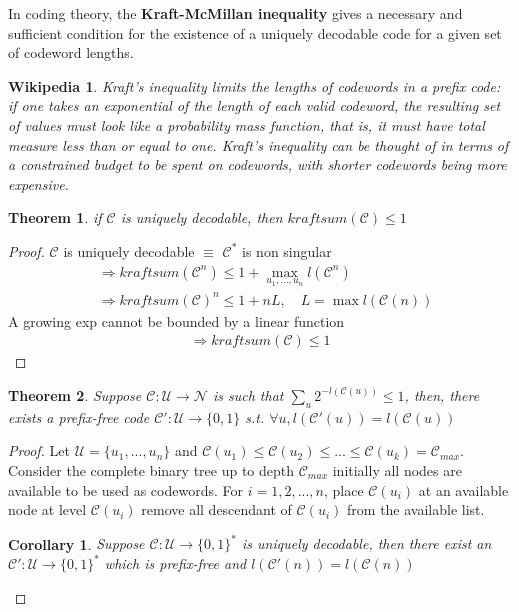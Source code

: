 \documentclass[twoside]{article}
\newtheorem{theorem}{Theorem}[section]
\newtheorem{corollary}{Corollary}[theorem]
\newtheorem*{wikipedia}{Wikipedia}
\theoremstyle{definition} %
\def\U{\mathcal{U}}
\def\N{\mathcal{N}}
\def\C{\mathcal{C}}
\begin{document}
In coding theory, the \textbf{Kraft-McMillan inequality} gives a necessary and sufficient condition for the existence of a uniquely decodable code for a given set of codeword lengths.

\begin{wikipedia}
  Kraft's inequality limits the lengths of codewords in a prefix code: if one takes an exponential of the length of each valid codeword, the resulting set of values must look like a probability mass function, that is, it must have total measure less than or equal to one. Kraft's inequality can be thought of in terms of a constrained budget to be spent on codewords, with shorter codewords being more expensive.
\end{wikipedia}

\begin{theorem}
  if $\C$ is uniquely decodable, then $kraftsum(\C) \leq 1$
\end{theorem}

\begin{proof}
  $\C$ is uniquely decodable $\equiv$ $\C^*$ is non singular
  \begin{align*}
    &\Rightarrow kraftsum(\C^n) \leq 1 + \max _{u_1, ..., u_n} l(\C^n) \\
    &\Rightarrow kraftsum(\C)^n \leq 1 + n L, \quad L = \max l(\C(n))
  \end{align*}
  A growing exp cannot be bounded by a linear function
  \begin{align*}
    \Rightarrow kraftsum(\C) \leq 1
  \end{align*}
\end{proof}

\begin{theorem}
  Suppose $\C : \U \rightarrow \N$ is such that $\sum_u 2^{-l(\C(u))} \leq 1$, then, there exists a prefix-free code $\C': \U \rightarrow \{0, 1\}$ s.t. $\forall u, l(\C'(u)) = l(\C(u))$
\end{theorem}

\begin{proof}
  Let $\U = \{u_1, ..., u_n\}$ and $\C(u_1) \leq \C(u_2) \leq ... \leq \C(u_k) = \C_{max}$.
  Consider the complete binary tree up to depth $\C_{max}$ initially all nodes are available to be used as codewords.
  For $i = 1, 2, ..., n$, place $\C(u_i)$ at an available node at level $\C(u_i)$ remove all descendant of $\C(u_i)$ from the available list.

  \begin{corollary}
    Suppose $\C: \U \rightarrow \{0, 1\}^*$ is uniquely decodable, then there exist an $\C': \U \rightarrow \{0, 1\}^*$ which is prefix-free and $l(\C'(n)) = l(\C(n))$
  \end{corollary}
\end{proof}
\end{document}
